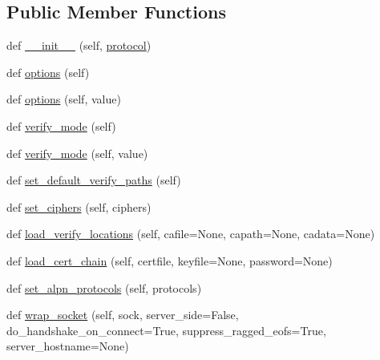 \subsection*{Public Member Functions}
\begin{DoxyCompactItemize}
\item 
def \hyperlink{classpip_1_1__vendor_1_1urllib3_1_1contrib_1_1pyopenssl_1_1PyOpenSSLContext_a19460f70ea5bc68e368276632ce47c4c}{\+\_\+\+\_\+init\+\_\+\+\_\+} (self, \hyperlink{classpip_1_1__vendor_1_1urllib3_1_1contrib_1_1pyopenssl_1_1PyOpenSSLContext_aff9b14a7e2046b5d336bf09b3a538bc1}{protocol})
\item 
def \hyperlink{classpip_1_1__vendor_1_1urllib3_1_1contrib_1_1pyopenssl_1_1PyOpenSSLContext_aba62a6535e9a714f3ba82260a8401e3d}{options} (self)
\item 
def \hyperlink{classpip_1_1__vendor_1_1urllib3_1_1contrib_1_1pyopenssl_1_1PyOpenSSLContext_a0b1b7f040183b5be7a136551f85774c4}{options} (self, value)
\item 
def \hyperlink{classpip_1_1__vendor_1_1urllib3_1_1contrib_1_1pyopenssl_1_1PyOpenSSLContext_a3c30e33eee18218625a88434c6844be0}{verify\+\_\+mode} (self)
\item 
def \hyperlink{classpip_1_1__vendor_1_1urllib3_1_1contrib_1_1pyopenssl_1_1PyOpenSSLContext_a6b5e5c7ea69a2ac3d0f2a37a72a6a5d1}{verify\+\_\+mode} (self, value)
\item 
def \hyperlink{classpip_1_1__vendor_1_1urllib3_1_1contrib_1_1pyopenssl_1_1PyOpenSSLContext_adf4be2e63634487d9fbeaadca72cf80d}{set\+\_\+default\+\_\+verify\+\_\+paths} (self)
\item 
def \hyperlink{classpip_1_1__vendor_1_1urllib3_1_1contrib_1_1pyopenssl_1_1PyOpenSSLContext_a1cda16c80d7536d90c4bb5c0d246461f}{set\+\_\+ciphers} (self, ciphers)
\item 
def \hyperlink{classpip_1_1__vendor_1_1urllib3_1_1contrib_1_1pyopenssl_1_1PyOpenSSLContext_a1c0e81ebbc683ffc4e40184ad184b9d8}{load\+\_\+verify\+\_\+locations} (self, cafile=None, capath=None, cadata=None)
\item 
def \hyperlink{classpip_1_1__vendor_1_1urllib3_1_1contrib_1_1pyopenssl_1_1PyOpenSSLContext_a41ee76cb5932c78bcb904104edc107bc}{load\+\_\+cert\+\_\+chain} (self, certfile, keyfile=None, password=None)
\item 
def \hyperlink{classpip_1_1__vendor_1_1urllib3_1_1contrib_1_1pyopenssl_1_1PyOpenSSLContext_ad0e767a853f37e81cbe36762f5be14f7}{set\+\_\+alpn\+\_\+protocols} (self, protocols)
\item 
def \hyperlink{classpip_1_1__vendor_1_1urllib3_1_1contrib_1_1pyopenssl_1_1PyOpenSSLContext_a472431b3e8a87fc94dbc7d82448dfc65}{wrap\+\_\+socket} (self, sock, server\+\_\+side=False, do\+\_\+handshake\+\_\+on\+\_\+connect=True, suppress\+\_\+ragged\+\_\+eofs=True, server\+\_\+hostname=None)
\end{DoxyCompactItemize}
